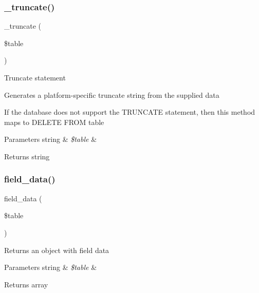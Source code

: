 \subsubsection{\texorpdfstring{\+\_\+truncate()}{\_truncate()}}
{\footnotesize\ttfamily \+\_\+truncate (\begin{DoxyParamCaption}\item[{}]{\$table }\end{DoxyParamCaption})\hspace{0.3cm}{\ttfamily [protected]}}

Truncate statement

Generates a platform-\/specific truncate string from the supplied data

If the database does not support the T\+R\+U\+N\+C\+A\+TE statement, then this method maps to \textquotesingle{}D\+E\+L\+E\+TE F\+R\+OM table\textquotesingle{}


\begin{DoxyParams}[1]{Parameters}
string & {\em \$table} & \\
\hline
\end{DoxyParams}
\begin{DoxyReturn}{Returns}
string 
\end{DoxyReturn}
\mbox{\label{class_c_i___d_b__pdo__sqlite__driver_a90355121e1ed009e0efdbd544ab56efa}} 
\subsubsection{\texorpdfstring{field\+\_\+data()}{field\_data()}}
{\footnotesize\ttfamily field\+\_\+data (\begin{DoxyParamCaption}\item[{}]{\$table }\end{DoxyParamCaption})}

Returns an object with field data


\begin{DoxyParams}[1]{Parameters}
string & {\em \$table} & \\
\hline
\end{DoxyParams}
\begin{DoxyReturn}{Returns}
array 
\end{DoxyReturn}
\mbox{\label{class_c_i___d_b__pdo__sqlite__driver_aef08cd376b16b24608100ca0e3f2f85b}} 
